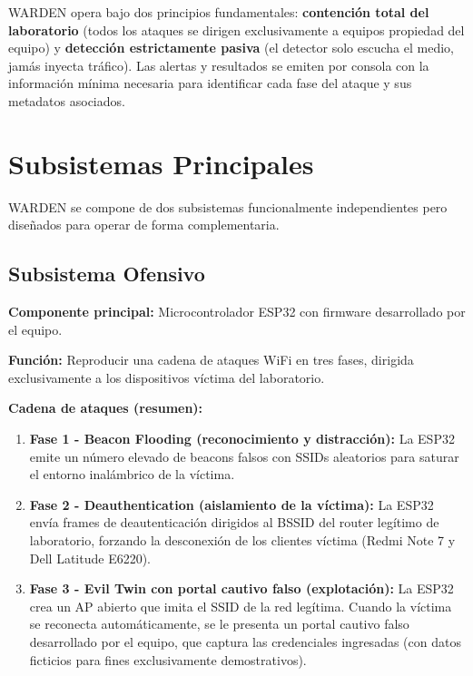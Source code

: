 \documentclass[11pt,a4paper]{article}
\begin{document}
WARDEN opera bajo dos principios fundamentales: \textbf{contención total
del laboratorio} (todos los ataques se dirigen exclusivamente a equipos
propiedad del equipo) y \textbf{detección estrictamente pasiva} (el
detector solo escucha el medio, jamás inyecta tráfico). Las alertas y
resultados se emiten por consola con la información mínima necesaria para
identificar cada fase del ataque y sus metadatos asociados.

\section{Subsistemas Principales}

WARDEN se compone de dos subsistemas funcionalmente independientes pero
diseñados para operar de forma complementaria.

\subsection{Subsistema Ofensivo}

\textbf{Componente principal:} Microcontrolador ESP32 con firmware
desarrollado por el equipo.

\textbf{Función:} Reproducir una cadena de ataques WiFi en tres fases,
dirigida exclusivamente a los dispositivos víctima del laboratorio.

\textbf{Cadena de ataques (resumen):}

\begin{enumerate}
  \item \textbf{Fase 1 - Beacon Flooding (reconocimiento y distracción):} La
    ESP32 emite un número elevado de beacons falsos con SSIDs aleatorios para
    saturar el entorno inalámbrico de la víctima.
  \item \textbf{Fase 2 - Deauthentication (aislamiento de la víctima):} La
    ESP32 envía frames de deautenticación dirigidos al BSSID del router
    legítimo de laboratorio, forzando la desconexión de los clientes víctima
    (Redmi Note 7 y Dell Latitude E6220).
  \item \textbf{Fase 3 - Evil Twin con portal cautivo falso (explotación):}
    La ESP32 crea un AP abierto que imita el SSID de la red legítima. Cuando
    la víctima se reconecta automáticamente, se le presenta un portal cautivo
    falso desarrollado por el equipo, que captura las credenciales ingresadas
    (con datos ficticios para fines exclusivamente demostrativos).
\end{enumerate}
\end{document}
